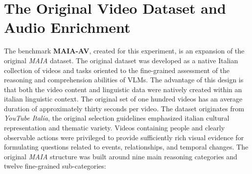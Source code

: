 \section{The Original Video Dataset and Audio Enrichment}
The benchmark \textbf{\ac{MAIA-AV}}, created for this experiment, is an expansion of the original \textit{\ac{MAIA}} dataset.
The original dataset was developed as a native Italian collection of videos and tasks oriented to the fine-grained assessment of the reasoning and comprehension abilities of \acp{VLM}. The advantage of this design is that both the video content and linguistic data were natively created within an italian linguistic context.
The original set of one hundred videos has an average duration of approximately thirty seconds per video. The dataset originates from \textit{YouTube Italia}, the original selection guidelines emphasized italian cultural representation and thematic variety. Videos containing people and clearly observable actions were privileged to provide sufficiently rich visual evidence for formulating questions related to events, relationships, and temporal changes.
The original \textit{\ac{MAIA}} structure was built around nine main reasoning categories and twelve fine-grained sub-categories:
